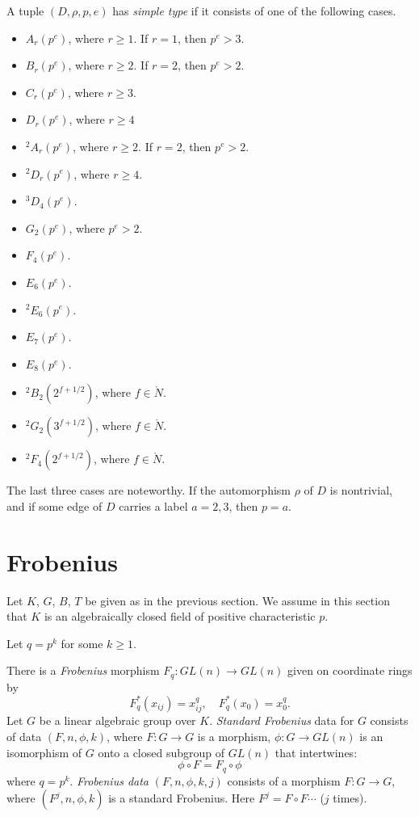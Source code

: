\begin{definition}\label{def:st}
  A tuple $(D,\rho,p,e)$ has {\it simple type}
  if it consists of one of the following cases.
\begin{itemize}
\item $A_r(p^e)$, where $r\ge 1$. If $r=1$, then $p^e>3$.
\item $B_r(p^e)$, where $r\ge 2$. If $r=2$, then $p^e > 2$.
\item $C_r(p^e)$, where $r\ge 3$.
\item $D_r(p^e)$, where $r\ge 4$
\item ${}^2A_r(p^e)$, where $r\ge 2$. If $r=2$, then $p^e > 2$.
\item ${}^2D_r(p^e)$, where $r\ge 4$.
\item ${}^3D_4(p^e)$.
\item $G_2(p^e)$, where $p^e > 2$.
\item $F_4(p^e)$.
\item $E_6(p^e)$.
\item ${}^2E_6(p^e)$.
\item $E_7(p^e)$.
\item $E_8(p^e)$.
\item ${}^2B_2(2^{f+1/2})$, where $f\in\ring{N}$.
\item ${}^2G_2(3^{f+1/2})$, where $f\in\ring{N}$.
\item ${}^2F_4(2^{f+1/2})$, where $f\in\ring{N}$.
\end{itemize}
\end{definition}

The last three cases are noteworthy.  If the automorphism $\rho$ of
$D$ is nontrivial, and if some edge of $D$ carries a label $a =2,3$,
then $p=a$.


\section{Frobenius}

Let $K$, $G$, $B$, $T$ be given as in the previous section.  We assume
in this section that $K$ is an algebraically closed field of positive
characteristic $p$.

Let $q = p^k$ for some $k\ge 1$.

There is a {\it Frobenius} morphism $F_q:GL(n)\to GL(n)$ given on
coordinate rings by
\[
F_q^*(x_{ij}) = x_{ij}^q,\quad F_q^*(x_0) = x_0^q.
\]
Let $G$ be a linear algebraic group over $K$.  {\it Standard
  Frobenius} data for $G$ consists of data $(F,n,\phi,k)$, where
$F:G\to G$ is a morphism, $\phi:G\to GL(n)$ is an isomorphism of $G$
onto a closed subgroup of $GL(n)$ that intertwines:
\[
\phi\circ F = F_q \circ \phi
\]
where $q= p^k$.  {\it Frobenius data} $(F,n,\phi,k,j)$ consists of a
morphism $F : G\to G$, where $(F^j,n,\phi,k)$ is a standard Frobenius.
Here $F^j = F\circ F\cdots$ ($j$ times).


